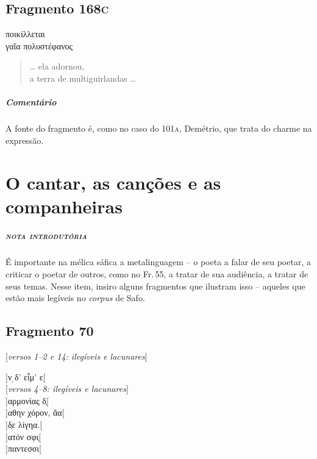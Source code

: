 \section{Fragmento 168\textsc{c}}

\begin{gkverse}
ποικίλλεται\\
    γαῖα πολυστέφανος 
\end{gkverse}

\begin{verse}
\ldots{} ela adornou,\\
a terra de multiguirlandas \ldots{}
\end{verse}

\medskip

{\paragraph{Comentário} A fonte do fragmento é, como no caso do 101\textsc{a}, Demétrio, que trata do charme na expressão.}



\chapter[O cantar, as canções e as companheiras]{O cantar, as canções e as companheiras}



\paragraph{\textsc{nota introdutória}}
É importante na mélica sáfica a metalinguagem -- o poeta a falar de seu
poetar, a criticar o poetar de outros, como no Fr.\,55, a tratar de sua
audiência, a tratar de seus temas. Nesse item, insiro alguns fragmentos que
ilustram isso -- aqueles que estão mais legíveis no \textit{corpus} de Safo.


\section{Fragmento 70}

\begin{gkverse}
\textnormal{[\textit{versos 1--2 e 14: ilegíveis e lacunares}]}

]ν ̣δ’ εἶμ’ ε[\\

\textnormal{[\textit{versos 4--8: ilegíveis e lacunares}]}\\

]αρμονίας δ̣[\\
         ]αθην χόρον, ἄα[\\
   ]δ̣ε λίγηα.[\\
   ]ατόν σφι̣[\\
  ]παντεσσι[

\end{gkverse}

